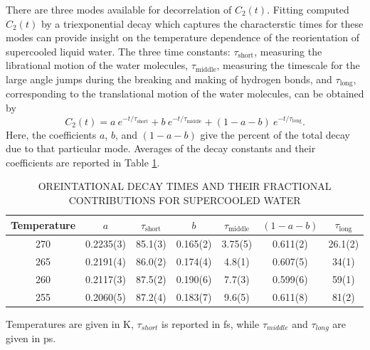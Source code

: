 There are three modes available for decorrelation of $C_2(t)$. Fitting
computed $C_2(t)$ by a triexponential decay which captures the
characterstic times for these modes can provide insight on the
temperature dependence of the reorientation of supercooled liquid
water. The three time constants: $\tau_\mathrm{short}$, measuring the
librational motion of the water molecules, $\tau_\mathrm{middle}$,
measuring the timescale for the large angle jumps during the breaking
and making of hydrogen bonds, and $\tau_\mathrm{long}$, corresponding
to the translational motion of the water molecules, can be obtained
by\cite{Louden2013a}
\begin{equation}
  C_{2}(t) = a~e^{-t/\tau_\mathrm{short}} + b~e^{-t/\tau_\mathrm{middle}} + 
  (1-a-b)~e^{-t/\tau_\mathrm{long}}.
\label{eq:c2}
\end{equation}
Here, the coefficients $a$, $b$, and $(1-a-b)$ give the percent of the
total decay due to that particular mode. Averages of the decay
constants and their coefficients are reported in Table
\ref{tab:supOrient}.


\begin{table}[h] \centering \caption{OREINTATIONAL DECAY TIMES AND
    THEIR FRACTIONAL CONTRIBUTIONS FOR SUPERCOOLED WATER\label{tab:supOrient}}
\begin{tabular}{ccccccc}
\hline
\hline
 Temperature & $a$ & $\tau_\mathrm{short}$& $b$ &
                                                  $\tau_\mathrm{middle}$
  & $(1-a-b)$ & $\tau_\mathrm{long}$\\
\hline
270 &0.2235(3) &85.1(3) & 0.165(2) & 3.75(5) & 0.611(2) & 26.1(2)\\
265 &0.2191(4) &86.0(2) & 0.174(4) & 4.8(1) & 0.607(5) & 34(1)\\
260 &0.2117(3) &87.5(2) & 0.190(6) & 7.7(3) & 0.599(6) & 59(1)\\
255 &0.2060(5) &87.2(4) & 0.183(7) & 9.6(5) & 0.611(8) & 81(2)\\
\hline
\hline
\hline
\end{tabular}
\begin{flushleft}
Temperatures are given in K, $\tau_{short}$ is reported in fs, while $\tau_{middle}$ and
$\tau_{long}$ are given in ps.
\end{flushleft}
\end{table}



